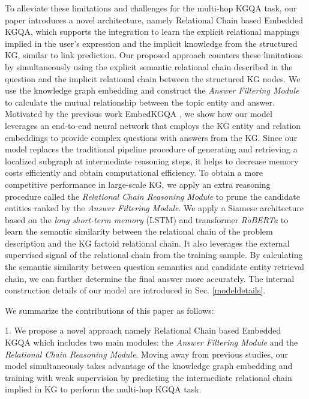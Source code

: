 \documentclass[pdflatex,sn-mathphys]{sn-jnl}%
\theoremstyle{thmstyleone}%
\theoremstyle{thmstyletwo}%
\theoremstyle{thmstylethree}%
\begin{document}
To alleviate these limitations and challenges for the multi-hop KGQA task, our paper introduces a novel architecture, namely Relational Chain based Embedded KGQA, which supports the integration to learn the explicit relational mappings implied in the user's expression and the implicit knowledge from the structured KG, similar to link prediction. Our proposed approach counters these limitations by simultaneously using the explicit semantic relational chain described in the question and the implicit relational chain between the structured KG nodes. We use the knowledge graph embedding and construct the \textit{Answer Filtering Module} to calculate the mutual relationship between the topic entity and answer.
Motivated by the previous work EmbedKGQA \cite{apoorv2020embedKGQA}, we show how our model leverages an end-to-end neural network that employs the KG entity and relation embeddings to provide complex questions with answers from the KG. Since our model replaces the traditional pipeline procedure of generating and retrieving a localized subgraph at intermediate reasoning steps, it helps to decrease memory costs efficiently and obtain computational efficiency. To obtain  a more competitive performance in large-scale KG, we apply an extra reasoning procedure called the \textit{Relational Chain Reasoning Module} to prune the candidate entities ranked by the \textit{Answer Filtering Module}. We apply a Siamese architecture \cite{sia2016jonas} based on the \textit{long short-term memory } (LSTM) \cite{gjq2022kbs} and transformer \textit{RoBERTa} \cite{roberta} to learn the semantic similarity between the relational chain of the problem description and the KG factoid relational chain. It also leverages the external supervised signal of the relational chain from the training sample. By calculating the semantic similarity between question semantics and candidate entity retrieval chain, we can further determine the final answer more accurately. The internal construction details of our model are introduced in Sec. \ref{modeldetails}.

We summarize the contributions of this paper as follows:

1. We propose a novel approach namely Relational Chain based Embedded KGQA which includes two main modules: the \textit{Answer Filtering Module} and the \textit{Relational Chain Reasoning Module}. Moving away from previous studies, our model simultaneously takes advantage of the knowledge graph embedding and training with weak supervision by predicting the intermediate relational chain implied in KG to perform the multi-hop KGQA task.
\end{document}
